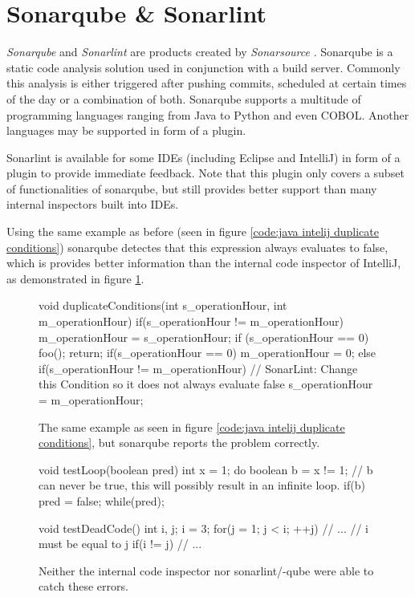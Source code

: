 \section{Sonarqube \& Sonarlint} %
\label{sec:sonar}
\emph{Sonarqube} \cite{sonarqube} and \emph{Sonarlint} \cite{SonarLintFixIssues} are products created by \emph{Sonarsource} \cite{CodeQualityCode}. Sonarqube is a static code analysis solution used in conjunction with a build server.
Commonly this analysis is either triggered after pushing commits, scheduled at certain times of the day or a combination of both.
Sonarqube supports a multitude of programming languages ranging from Java to Python and even COBOL. Another languages may be supported in form of a plugin.


Sonarlint is available for some IDEs (including Eclipse and IntelliJ) in form of a plugin to provide immediate feedback. Note that this plugin only covers a subset of functionalities of sonarqube, but still provides better support than many internal inspectors built into IDEs.


Using the same example as before (seen in figure \ref{code:java intelij duplicate conditions}) sonarqube detectes that this expression always evaluates to false, which is provides better information than the internal code inspector of IntelliJ, as demonstrated in figure \ref{code:java sonarqube duplicate conditions}.

\begin{figure}
	\begin{JavaCode}
		void duplicateConditions(int s_operationHour, int m_operationHour) {
			if(s_operationHour != m_operationHour) {
				m_operationHour = s_operationHour;
				if (s_operationHour == 0) {
					foo();        
				}
				return;
			}
			if(s_operationHour == 0) {
				m_operationHour = 0;
			} else {
				if(s_operationHour != m_operationHour) { // SonarLint: Change this Condition so it does not always evaluate false
					s_operationHour = m_operationHour;
				}
			}
	}\end{JavaCode}
	\caption{The same example as seen in figure \ref{code:java intelij duplicate conditions}, but sonarqube reports the problem correctly. }
	\label{code:java sonarqube duplicate conditions}
\end{figure}

\begin{figure}
	\begin{JavaCode}
void testLoop(boolean pred) {
	int x = 1;
	do {
		boolean b = x != 1;
		// b can never be true, this will possibly result in an infinite loop.
		if(b) {
			pred = false;
		}
	} while(pred);
}

void testDeadCode() {
	int i, j;
	i = 3;
	for(j = 1; j < i; ++j) {
		// ...
	}
	// i must be equal to j
	if(i != j) { 
		// ...
	}
}\end{JavaCode}
	\caption{Neither the internal code inspector nor sonarlint/-qube were able to catch these errors. }
	\label{code:java sonarqube hard example}
\end{figure}

